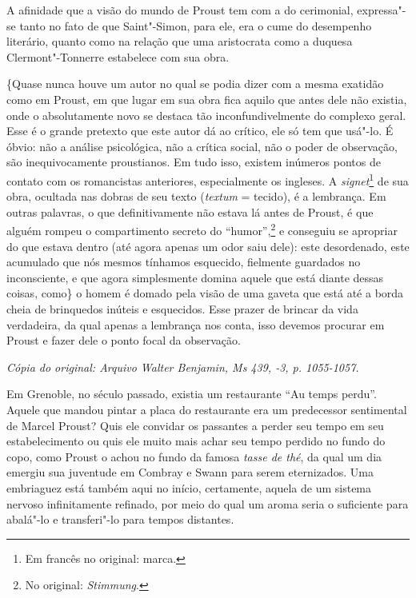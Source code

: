 A afinidade que a visão do mundo de Proust tem com a do cerimonial,
expressa"-se tanto no fato de que Saint"-Simon, para ele, era o cume do
desempenho literário, quanto como na relação que uma aristocrata como a
duquesa Clermont"-Tonnerre estabelece com sua obra.

\{Quase nunca houve um autor no qual se podia dizer com a mesma exatidão
como em Proust, em que lugar em sua obra fica aquilo que antes dele não
existia, onde o absolutamente novo se destaca tão inconfundivelmente do
complexo geral. Esse é o grande pretexto que este autor dá ao crítico,
ele só tem que usá"-lo. É óbvio: não a análise psicológica, não a crítica
social, não o poder de observação, são inequivocamente proustianos. Em
tudo isso, existem inúmeros pontos de contato com os romancistas
anteriores, especialmente os ingleses. A \emph{signet}\footnote{Em francês no original: marca. \versal{[N. T.]}} de sua obra, ocultada nas dobras de
seu texto (\emph{textum} = tecido), é a lembrança. Em outras palavras, o
que definitivamente não estava lá antes de Proust, é que alguém rompeu o
compartimento secreto do ``humor'',\footnote{No original:
  \emph{Stimmung}. \versal{[N. T.]}} e conseguiu se apropriar do que estava dentro (até
agora apenas um odor saiu dele): este desordenado, este acumulado que
nós mesmos tínhamos esquecido, fielmente guardados no inconsciente, e
que agora simplesmente domina aquele que está diante dessas coisas,
como\} o homem é domado pela visão de uma gaveta que está até a borda
cheia de brinquedos inúteis e esquecidos. Esse prazer de brincar da vida
verdadeira, da qual apenas a lembrança nos conta, isso devemos procurar
em Proust e fazer dele o ponto focal da observação.


\begin{flushright}
\emph{\small{Cópia do original: Arquivo Walter Benjamin, Ms 439, -3, p. 1055-1057.}}
\end{flushright}

Em Grenoble, no século passado, existia um restaurante ``Au temps
perdu''. Aquele que mandou pintar a placa do restaurante era um
predecessor sentimental de Marcel Proust? Quis ele convidar os passantes
a perder seu tempo em seu estabelecimento ou quis ele muito mais achar
seu tempo perdido no fundo do copo, como Proust o achou no fundo da
famosa \emph{tasse de thé}, da qual um dia emergiu sua juventude em
Combray e Swann para serem eternizados. Uma embriaguez está também aqui
no início, certamente, aquela de um sistema nervoso infinitamente
refinado, por meio do qual um aroma seria o suficiente para abalá"-lo e
transferi"-lo para tempos distantes.

